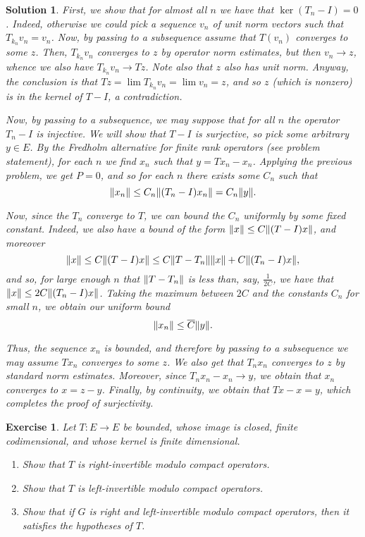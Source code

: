 \documentclass{article}
\newtheorem{ex}{Exercise}
\theoremstyle{nonumberplain}
\newtheorem{sol}{Solution}
\DeclarePairedDelimiter{\Norm}{\lVert}{\rVert}
\begin{document}
\begin{sol}
First, we show that for almost all $n$ we have that $\ker(T_n - I) = 0$. Indeed, otherwise we could pick a sequence $v_n$ of unit norm vectors such that $T_{k_n} v_n = v_n$. Now, by passing to a subsequence assume that $T(v_n)$ converges to some $z$. Then, $T_{k_n} v_n$ converges to $z$ by operator norm estimates, but then $v_n \to z$, whence we also have $T_{k_n} v_n \to T z$. Note also that $z$ also has unit norm. Anyway, the conclusion is that $T z = \lim T_{k_n} v_n = \lim v_n = z$, and so $z$ (which is nonzero) is in the kernel of $T-I$, a contradiction.

Now, by passing to a subsequence, we may suppose that for all $n$ the operator $T_n-I$ is injective. We will show that $T-I$ is surjective, so pick some arbitrary $y \in E$. By the Fredholm alternative for finite rank operators (see problem statement), for each $n$ we find $x_n$ such that $y = Tx_n - x_n$. Applying the previous problem, we get $P = 0$, and so for each $n$ there exists some $C_n$ such that
\begin{equation}
\Norm{x_n} \leq C_n \Norm{(T_n-I)x_n} = C_n \Norm{y}.
\end{equation}

Now, since the $T_n$ converge to $T$, we can bound the $C_n$ uniformly by some fixed constant. Indeed, we also have a bound of the form $\Norm{x} \leq C \Norm{(T-I)x}$, and moreover
\begin{equation}
\Norm{x} \leq C \Norm{(T-I)x} \leq C \Norm{T-T_n} \Norm{x} + C \Norm{(T_n - I)x},
\end{equation}
and so, for large enough $n$ that $\Norm{T-T_n}$ is less than, say, $\frac1{2C}$, we have that $\Norm{x} \leq 2C \Norm{(T_n - I)x}$. Taking the maximum between $2C$ and the constants $C_n$ for small $n$, we obtain our uniform bound
\begin{equation}
\Norm{x_n} \leq \overline{C} \Norm{y}.
\end{equation}

Thus, the sequence $x_n$ is bounded, and therefore by passing to a subsequence we may assume $T x_n$ converges to some $z$. We also get that $T_n x_n$ converges to $z$ by standard norm estimates. Moreover, since $T_n x_n - x_n \to y$, we obtain that $x_n$ converges to $x = z-y$. Finally, by continuity, we obtain that $Tx - x = y$, which completes the proof of surjectivity.
\end{sol}

\begin{ex}
Let $T \colon E \to E$ be bounded, whose image is closed, finite codimensional, and whose kernel is finite dimensional.
\begin{enumerate}
\item Show that $T$ is right-invertible modulo compact operators.
\item Show that $T$ is left-invertible modulo compact operators.
\item Show that if $G$ is right and left-invertible modulo compact operators, then it satisfies the hypotheses of $T$.
\end{enumerate}
\end{ex}
\end{document}
